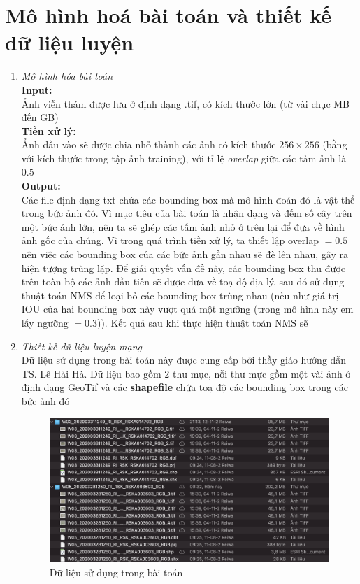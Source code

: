 \documentclass[a4paper, 12pt]{report}
\begin{document}
\section{Mô hình hoá bài toán và thiết kế dữ liệu luyện}
\begin{enumerate}[label= \textit{\alph*)}]
\item \textit{Mô hình hóa bài toán} \\
\textbf{Input:} \\
Ảnh viễn thám được lưu ở định dạng .tif, có kích thước lớn (từ vài chục MB đến GB) \\ \textbf{Tiền xử lý:} \\
Ảnh đầu vào sẽ được chia nhỏ thành các ảnh có kích thước $256 \times 256$ (bằng với kích thước trong tập ảnh training),  với tỉ lệ \textit{overlap} giữa các tấm ảnh là $0.5$ \\
\textbf{Output:} \\
Các file định dạng txt chứa các bounding box mà mô hình đoán đó là vật thể trong bức ảnh đó.  
Vì mục tiêu của bài toán là nhận dạng và đếm số cây trên một bức ảnh lớn,  nên ta sẽ ghép các tấm ảnh nhỏ ở trên lại để đưa về hình ảnh gốc của chúng.  Vì trong quá trình tiền xử lý, ta thiết lập overlap $= 0.5$ nên việc các bounding box của các bức ảnh gần nhau sẽ đè lên nhau,  gây ra hiện tượng trùng lặp.  Để giải quyết vấn đề này,  các bounding box thu được trên toàn bộ các ảnh đầu tiên sẽ được đưa về toạ độ địa lý, sau đó sử dụng thuật toán NMS để loại bỏ các bounding box trùng nhau (nếu như giá trị IOU của hai bounding box này vượt quá một ngưỡng (trong mô hình này em lấy ngưỡng $=0.3$)).  Kết quả sau khi thực hiện thuật toán NMS sẽ 


\item \textit{Thiết kế dữ liệu luyện mạng} \\
Dữ liệu sử dụng trong bài toán này được cung cấp bởi thầy giáo hướng dẫn TS.  Lê Hải Hà.  Dữ liệu bao gồm 2 thư mục,  nỗi thư mực gồm một vài ảnh ở định dạng GeoTif và các \textbf{shapefile} chứa toạ độ các bounding box trong các bức ảnh đó
 \begin{figure}[!htb]
	\centering
	\includegraphics[width=1\linewidth]{Images/data_folder}
	\caption{Dữ liệu sử dụng trong bài toán}
	\label{fig:data_folder}
\end{figure}


\end{enumerate}
\end{document}
